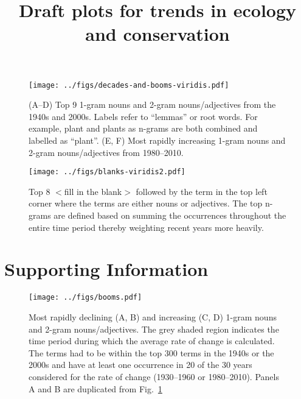 \documentclass[12pt]{article}
\title{Draft plots for trends in ecology and conservation}
\author{}
\begin{document}
\maketitle


\begin{figure}[htbp]
\centering
\texttt{[image: ../figs/decades-and-booms-viridis.pdf]}
\caption{
(A--D) Top 9 1-gram nouns and 2-gram nouns/adjectives from the 1940s and 2000s.
Labels refer to ``lemmas'' or root words. For example, plant and plants as
n-grams are both combined and labelled as ``plant''. (E, F) Most rapidly
increasing 1-gram nouns and 2-gram nouns/adjectives from 1980--2010.}
\label{fig:decades}
\end{figure}

\begin{figure}[htbp]
\centering
\texttt{[image: ../figs/blanks-viridis2.pdf]}
\caption{Top 8 $<$fill in the blank$>$ followed by the term in the top left
corner where the terms are either nouns or adjectives. The top n-grams are
defined based on summing the occurrences throughout the entire time period
thereby weighting recent years more heavily.}
\label{fig:top}
\end{figure}

\clearpage

\section{Supporting Information}

\renewcommand{\thefigure}{S\arabic{figure}}
\renewcommand{\thetable}{S\arabic{table}}
\setcounter{figure}{0}
\setcounter{table}{0}

\begin{figure}[htbp]
\centering
\texttt{[image: ../figs/booms.pdf]}
\caption{Most rapidly declining (A, B) and increasing (C, D) 1-gram nouns and
  2-gram nouns/adjectives. The grey shaded region indicates the time period
  during which the average rate of change is calculated. The terms had to be
  within the top 300 terms in the 1940s or the 2000s and have at least one
  occurrence in 20 of the 30 years considered for the rate of change (1930--1960
  or 1980--2010). Panels A and B are duplicated from Fig.~\ref{fig:decades}}
\label{fig:booms}
\end{figure}
\end{document}
